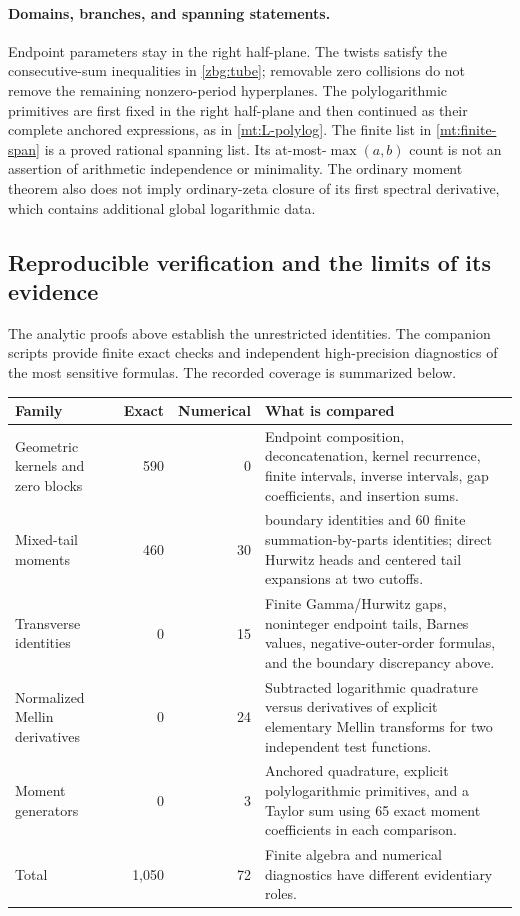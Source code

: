 \paragraph{Domains, branches, and spanning statements.}
Endpoint parameters stay in the right half-plane.  The twists satisfy
the consecutive-sum inequalities in \eqref{zbg:tube}; removable zero
collisions do not remove the remaining nonzero-period hyperplanes.
The polylogarithmic primitives are first fixed in the right half-plane
and then continued as their complete anchored expressions, as in
\eqref{mt:L-polylog}.  The finite list in \eqref{mt:finite-span} is
a proved rational spanning list.  Its at-most-$\max(a,b)$ count is not
an assertion of arithmetic independence or minimality.  The ordinary
moment theorem also does not imply ordinary-zeta closure of its first
spectral derivative, which contains additional global logarithmic data.

\subsection{Reproducible verification and the limits of its evidence}

The analytic proofs above establish the unrestricted identities.
The companion scripts provide finite exact checks and independent
high-precision diagnostics of the most sensitive formulas.  The
recorded coverage is summarized below.

\begin{center}
\small
\begin{tabular}{@{}>{\raggedright\arraybackslash}p{1.40in}rr>{\raggedright\arraybackslash}p{3.43in}@{}}
\toprule
Family & Exact & Numerical & What is compared\\
\midrule
Geometric kernels and zero blocks
 & 590 & 0
 & Endpoint composition, deconcatenation, kernel recurrence, finite
   intervals, inverse intervals, gap coefficients, and insertion sums.\\[4pt]
Mixed-tail moments
 & 460 & 30
 & 400 boundary identities and 60 finite summation-by-parts identities;
   direct Hurwitz heads and centered tail expansions at two cutoffs.\\[4pt]
Transverse identities
 & 0 & 15
 & Finite Gamma/Hurwitz gaps, noninteger endpoint tails, Barnes values,
   negative-outer-order formulas, and the boundary discrepancy above.\\[4pt]
Normalized Mellin derivatives
 & 0 & 24
 & Subtracted logarithmic quadrature versus derivatives of explicit
   elementary Mellin transforms for two independent test functions.\\[4pt]
Moment generators
 & 0 & 3
 & Anchored quadrature, explicit polylogarithmic primitives, and a Taylor
   sum using 65 exact moment coefficients in each comparison.\\[4pt]
\midrule
Total & 1,050 & 72 & Finite algebra and numerical diagnostics have
                         different evidentiary roles.\\
\bottomrule
\end{tabular}
\end{center}

